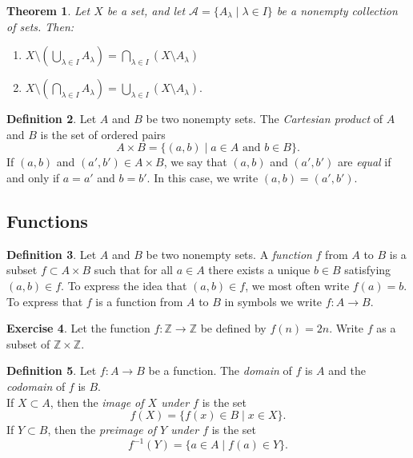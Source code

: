 \documentclass[11pt]{article}
\newtheorem{theorem}{Theorem}[section]
\theoremstyle{definition}
\newtheorem{definition}[theorem]{Definition}
\newtheorem{exercise}[theorem]{Exercise}
\numberwithin{equation}{subsection}
\begin{document}
\begin{theorem}  
Let $X$ be a set, and let  $\mathcal{A}=\{A_\lambda\mid \lambda\in I\}$ be a nonempty collection of sets. Then:
\begin{enumerate}
\item
$X\setminus \left( \bigcup_{\lambda\in I}A_\lambda\right) =\bigcap_{\lambda\in I} (X\setminus A_\lambda)$

\item
$X\setminus \left( \bigcap_{\lambda\in I}A_\lambda\right)  =\bigcup_{\lambda\in I} (X\setminus A_\lambda).$
\end{enumerate}
\end{theorem}\medskip


\begin{definition}  Let $A$ and $B$ be two nonempty sets. 
The \emph{Cartesian product} of $A$ and $B$ is the set of ordered pairs
\[
A \times B = \{ (a, b) \mid \text{$a \in A$ and $b \in B$} \}.
\]
If $(a, b)$ and $(a', b') \in A \times B$, we say that $(a, b)$ and $(a', b')$ are
\emph{equal} if and only if $a = a'$ and $b = b'$. In this case, we write $
(a, b) = (a', b').$


\end{definition}




\subsection*{Functions}

\begin{definition} Let $A$ and $B$ be two nonempty sets.  
A \emph{function} $f$ from $A$ to $B$ is a subset $f \subset A \times B$ such that for all $a \in A$ there exists a unique $b \in B$ satisfying $(a, b) \in f$.  To express the idea that $(a, b) \in f$, we most
often write $f(a) = b$.  To express that $f$ is a function from $A$ to $B$ in symbols we write $f \colon A \rightarrow B$.  
\end{definition}


\begin{exercise}  
Let the function $f \colon \mathbb{Z} \rightarrow \mathbb{Z}$ be defined by
$f(n)=2n$.  Write $f$ as a subset of $\mathbb{Z} \times \mathbb{Z}$.  
\end{exercise}

\begin{definition}  Let $f \colon A \rightarrow B$ be a function.  The \emph{domain} of $f$ is $A$ and the \emph{codomain} of $f$ is $B.$\\
If $X \subset A$, then the \emph{image of $X$ under $f$} is the set
\[
f(X) = \{ f(x) \in B \mid  x \in X \}.
\]
If $Y \subset B$, then the \emph{preimage of $Y$ under $f$} is the set
\[
f^{-1}(Y) = \{ a \in A \mid f(a) \in Y \}.
\]
\end{definition}
\end{document}

